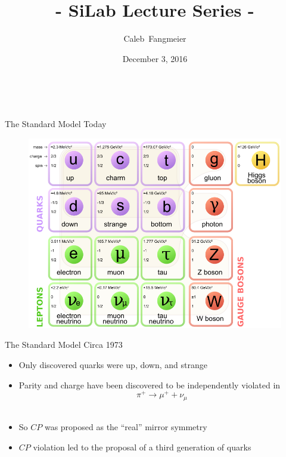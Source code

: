 \documentclass{beamer}
\title[\textbf{\thetitle}]{\-- SiLab Lecture Series \-- \\ \textbf{\thetitle}}
\author{Caleb~Fangmeier}
\institute[UNL]{University of Nebraska \-- Lincoln}
\date{December 3, 2016}
\begin{document}
\begin{frame}
  \titlepage\
\end{frame}


\begin{frame}{The Standard Model Today}
    \begin{center}
      \begin{figure}
        \includegraphics[width=\textwidth]{figures/Standard_Model_of_Elementary_Particles.png}
      \end{figure}
    \end{center}
\end{frame}

\begin{frame}{The Standard Model Circa 1973}
  \begin{itemize}
    \item Only discovered quarks were up, down, and strange
    \pause\
    \item Parity and charge have been discovered to be independently violated in
      \begin{equation*}
        \pi^{+} \rightarrow \mu^{+}+\nu_{\mu}
      \end{equation*}
    \pause\
    \item So $CP$ was proposed as the ``real'' mirror symmetry
    \pause\
    \item $CP$ violation led to the proposal of a third generation of quarks
  \end{itemize}
\end{frame}
\end{document}
